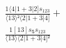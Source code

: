 \documentclass[varwidth, border=5pt]{standalone}
\begin{document}
\begin{my}
$\begin{gathered}
\scriptscriptstyle\frac{1⟨4|1+3|2]s_{123}}{⟨13⟩²⟨2|1+3|4]} +\\
\scriptscriptstyle\frac{1[13]s_{𝟓}s_{123}}{⟨13⟩⟨2|1+3|4]²} \phantom{+}
\end{gathered}$
\end{my}
\end{document}
